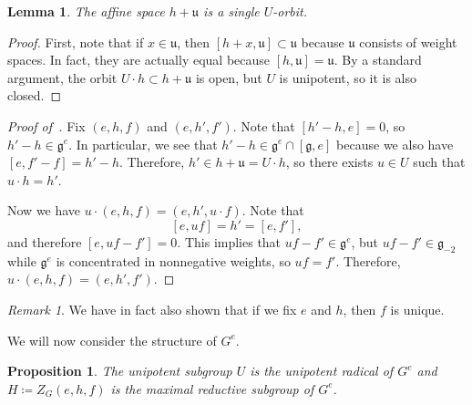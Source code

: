 \documentclass{amsart}
\newtheorem{prop}[thm]{Proposition}
\newtheorem{lem}[thm]{Lemma}
\theoremstyle{definition}
\theoremstyle{remark}
\newtheorem{rmk}[thm]{Remark}
\theoremstyle{plain}
\theoremstyle{definition}
\theoremstyle{remark}
\newcommand{\g}{\mathfrak{g}}
\newcommand{\mf}[1]{\mathfrak{#1}}
\newcommand{\1}{\mathbf{1}}
\newcommand{\2}{\mathbf{2}}
\newcommand{\3}{\mathbf{3}}
\begin{document}
\begin{lem}
    The affine space \(h + \mf{u}\) is a single \(U\)-orbit.
\end{lem}

\begin{proof}
    First, note that if \(x \in \mf{u}\), then \([h+x, \mf{u}] \subset \mf{u}\) because \(\mf{u}\) consists of weight spaces. In fact, they are actually equal because \([h, \mf{u}] = \mf{u}\). By a standard argument, the orbit \(U \cdot h \subset h + \mf{u}\) is open, but \(U\) is unipotent, so it is also closed.
\end{proof}

\begin{proof}[Proof of~]
    Fix \((e,h,f)\) and \((e, h', f')\). Note that \([h'-h, e] = 0\), so \(h' - h \in \g^e\). In particular, we see that \(h' - h \in \g^e \cap [\g, e]\) because we also have \([e, f'-f] = h'-h\). Therefore, \(h' \in h + \mf{u} = U \cdot h\), so there exists \(u \in U\) such that \(u \cdot h = h'\).

    Now we have \(u \cdot (e,h,f) = (e, h', u \cdot f)\). Note that
    \[ [e, uf] = h' = [e, f'], \]
    and therefore \([e, uf-f'] = 0\). This implies that \(uf - f' \in \g^e\), but \(uf - f' \in \g_{-2}\) while \(\g^e\) is concentrated in nonnegative weights, so \(uf = f'\). Therefore, \(u \cdot (e,h,f) = (e,h',f')\).
\end{proof}

\begin{rmk}
    We have in fact also shown that if we fix \(e\) and \(h\), then \(f\) is unique.
\end{rmk}

We will now consider the structure of \(G^e\).
\begin{prop}\label{prop:structure-of-centralizer}
    The unipotent subgroup \(U\) is the unipotent radical of \(G^e\) and \(H \coloneqq Z_G(e, h, f)\) is the maximal reductive subgroup of \(G^e\).
\end{prop}
\end{document}
